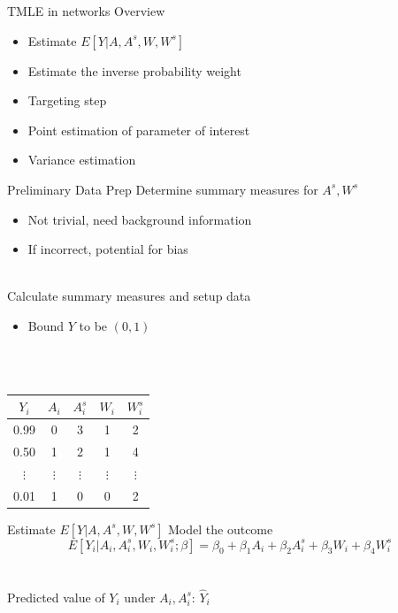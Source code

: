 \documentclass{beamer}
\begin{document}
\begin{frame}{TMLE in networks}
	Overview
	\begin{itemize}
		\item Estimate $E[Y | A,A^s,W,W^s]$
		\item Estimate the inverse probability weight
		\item Targeting step
		\item Point estimation of parameter of interest
		\item Variance estimation
	\end{itemize}
\end{frame}

\begin{frame}{Preliminary Data Prep}
	Determine summary measures for $A^s,W^s$
	\begin{itemize}
		\item Not trivial, need background information
		\item If incorrect, potential for bias
	\end{itemize}~\\
	Calculate summary measures and setup data
	\begin{itemize}
		\item Bound $Y$ to be $(0, 1)$
	\end{itemize}~\\~\\
	\begin{center}
	\begin{tabular}{ccccc}
		\hline
		$Y_i$    & $A_i$    & $A_i^s$  & $W_i$    & $W_i^s$  \\ \hline
		0.99     & 0        & 3        & 1        & 2        \\
		0.50     & 1        & 2        & 1        & 4        \\
		$\vdots$ & $\vdots$ & $\vdots$ & $\vdots$ & $\vdots$ \\
		0.01     & 1        & 0        & 0        & 2        \\ \hline
	\end{tabular}
	\end{center}
\end{frame}

\begin{frame}{Estimate $E[Y | A,A^s,W,W^s]$}
	Model the outcome
	\[E[Y_i|A_i,A_i^s,W_i,W_i^s ; \beta] = \beta_0 + \beta_1 A_i + \beta_2 A_i^s + \beta_3 W_i + \beta_4 W_i^s\]~\\~\\
	Predicted value of $Y_i$ under $A_i,A_i^s$: $\hat{Y}_i$
\end{frame}
\end{document}
